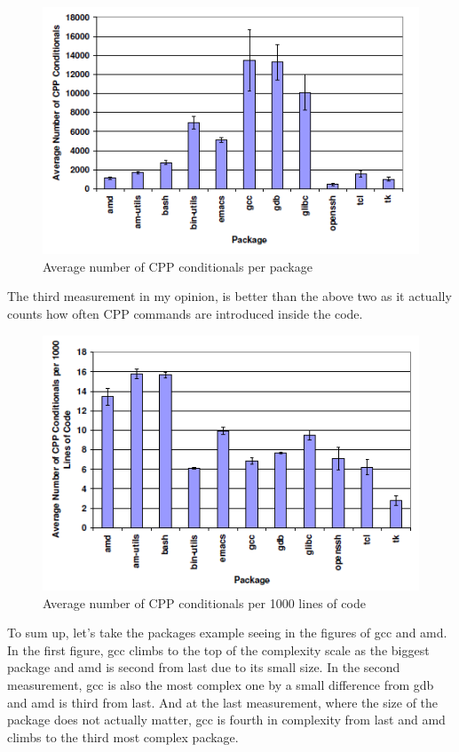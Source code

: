 \documentclass[11pt]{article}
\begin{document}
\begin{figure}[!htb]
\centering
  \includegraphics[width=.7\linewidth]{images/measure2}
  \caption{Average number of CPP conditionals per package \cite{zadok2002}}
  \label{fig:measure2}
\end{figure}
\FloatBarrier

The third measurement in my opinion, is better than the above two as it actually counts how often CPP commands are introduced inside the code.

\begin{figure}[!htb]
\centering
  \includegraphics[width=.7\linewidth]{images/measure3}
  \caption{Average number of CPP conditionals per 1000 lines
of code \cite{zadok2002}}
  \label{fig:measure3}
\end{figure}
\FloatBarrier
To sum up, let's take the packages example seeing in the figures of gcc and amd. In the first figure, gcc climbs to the top of the complexity scale as the biggest package and amd is second from last due to its small size. In the second measurement, gcc is also the most complex one by a small difference from gdb and amd is third from last. And at the last measurement, where the size of the package does not actually matter, gcc is fourth in complexity from last and amd climbs to the third most complex package.
\end{document}
